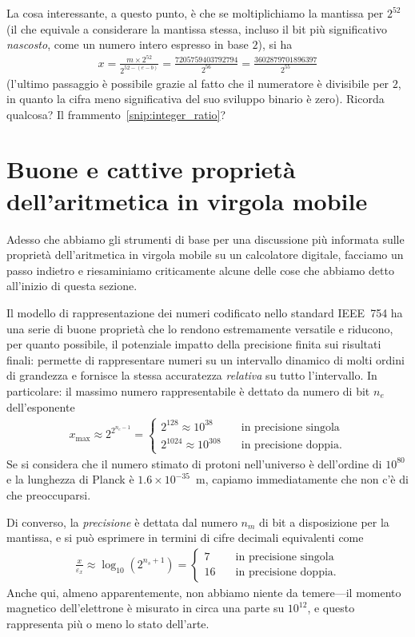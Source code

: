 La cosa interessante, a questo punto, è che se moltiplichiamo la mantissa per
$2^{52}$ (il che equivale a considerare la mantissa stessa, incluso il bit più
significativo \emph{nascosto}, come un numero intero espresso in base $2$), si ha
\begin{align*}
  x = \frac{m \times 2^{52}}{2^{52 - (e  - b)}} =
  \frac{7205759403792794}{2^{56}} = \frac{3602879701896397}{2^{55}}
\end{align*}
(l'ultimo passaggio è possibile grazie al fatto che il numeratore è divisibile
per $2$, in quanto la cifra meno significativa del suo sviluppo binario è zero).
Ricorda qualcosa? Il frammento~\ref{snip:integer_ratio}?


\section{Buone e cattive proprietà dell'aritmetica in virgola mobile}

Adesso che abbiamo gli strumenti di base per una discussione più informata sulle
proprietà dell'aritmetica in virgola mobile su un calcolatore digitale,
facciamo un passo indietro e riesaminiamo criticamente alcune delle cose che
abbiamo detto all'inizio di questa sezione.

Il modello di rappresentazione dei numeri codificato nello standard IEEE~754
ha una serie di buone proprietà che lo rendono estremamente versatile e
riducono, per quanto possibile, il potenziale impatto della precisione finita
sui risultati finali: permette di rappresentare numeri su un intervallo dinamico
di molti ordini di grandezza e fornisce la stessa accuratezza \emph{relativa}
su tutto l'intervallo. In particolare: il massimo numero rappresentabile è dettato
da numero di bit $n_e$ dell'esponente
\begin{align*}
  x_\text{max} \approx 2^{2^{n_e - 1}} =
  \begin{cases}
    2^{128} \approx 10^{38} \quad & \text{in precisione singola}\\
    2^{1024} \approx 10^{308} \quad & \text{in precisione doppia}.
  \end{cases}
\end{align*}
Se si considera che il numero stimato di protoni nell'universo è dell'ordine di
$10^{80}$ e la lunghezza di Planck è $1.6 \times 10^{-35}$~m, capiamo
immediatamente che non c'è di che preoccuparsi.

Di converso, la \emph{precisione} è dettata dal numero $n_m$ di bit a disposizione
per la mantissa, e si può esprimere in termini di cifre decimali equivalenti
come
\begin{align*}
  \frac{x}{\varepsilon_x} \approx \log_{10} \left( 2^{n_s + 1}\right) =
  \begin{cases}
    7 \quad & \text{in precisione singola}\\
    16 \quad & \text{in precisione doppia}.
  \end{cases}
\end{align*}
Anche qui, almeno apparentemente, non abbiamo niente da temere---il momento magnetico
dell'elettrone è misurato in circa una parte su $10^{12}$, e questo
rappresenta più o meno lo stato dell'arte.

